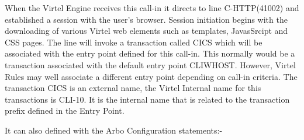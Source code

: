 \documentclass[letterpaper,10pt,english]{sphinxmanual}
\begin{document}
\begin{sphinxVerbatim}[commandchars=\\\{\}]
\end{sphinxVerbatim}

When the Virtel Engine receives this call-in it directs to line C-HTTP(41002) and established a session with the user’s browser. Session initiation begins with the downloading of various Virtel web elements such as templates, JavasSrcipt and CSS pages. The line will invoke a transaction called CICS which will be associated with the entry point defined for this call-in. This normally would be a transaction associated with the default entry point CLIWHOST. However, Virtel Rules may well associate a different entry point depending on call-in criteria. The transaction CICS is an external name, the Virtel Internal name for this transactions is CLI-10. It is the internal name that is related to the transaction prefix defined in the Entry Point.


It can also defined with the Arbo Configuration statements:-

\begin{sphinxVerbatim}[commandchars=\\\{\}]
                                      
                                            
                                   
                                           
                                                 
                                         
                                              
\end{sphinxVerbatim}
\end{document}
